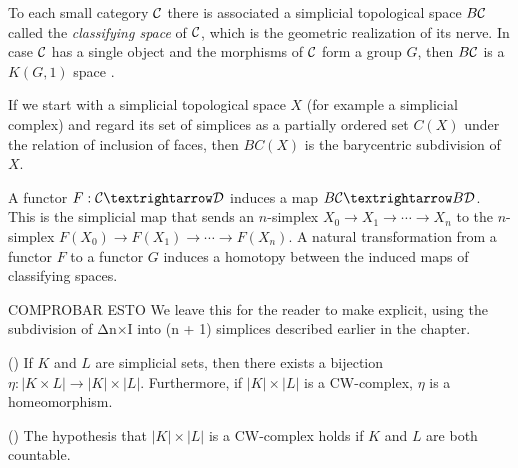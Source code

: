 \documentclass[TFM.tex]{subfiles}
\begin{document}
\begin{ex}
To each small category $\mathcal{C}$ there is associated a simplicial topological space $B\mathcal{C}$ called the \emph{classifying
space} of $\mathcal{C}$, which is the geometric realization of its nerve. In
case $\mathcal{C}$ has a single object and the morphisms of $\mathcal{C}$ form a group $G$, then $B\mathcal{C}$ is a $K(G, 1)$ space \cite{Hatcher}.

If we start with a
simplicial topological space $X$ (for example a simplicial complex) and regard its set of simplices as a partially ordered set $C(X)$ under
the relation of inclusion of faces, then $BC(X)$ is the barycentric subdivision of $X$.

A functor $F :\CC→\DD$ induces a map $B\CC→B\DD$. This is the simplicial map that sends an
$n$-simplex $X_0→X_1→\cdots →X_n$ to the $n$-simplex $F(X_0)→F(X_1)→\cdots →F(X_n)$.
A natural transformation from a functor $F$ to a functor $G$ induces a homotopy
between the induced maps of classifying spaces. 

COMPROBAR ESTO We leave this for the reader to
make explicit, using the subdivision of Δn×I into (n + 1) simplices described
earlier in the chapter.
\end{ex}

\begin{thm}(\cite[Theorem 14.3]{May})
If $K$ and $L$ are simplicial sets, then there exists a bijection $\eta:|K\times L|\to|K|\times|L|$. Furthermore, if $|K|\times|L|$ is a CW-complex, $\eta$ is a homeomorphism.
\end{thm}

\begin{remark}(\cite[Theorem A.6]{Hatcher})\label{countable}
The hypothesis that $|K|\times|L|$ is a CW-complex holds if $K$ and $L$ are both countable. 
\end{remark}
\end{document}
